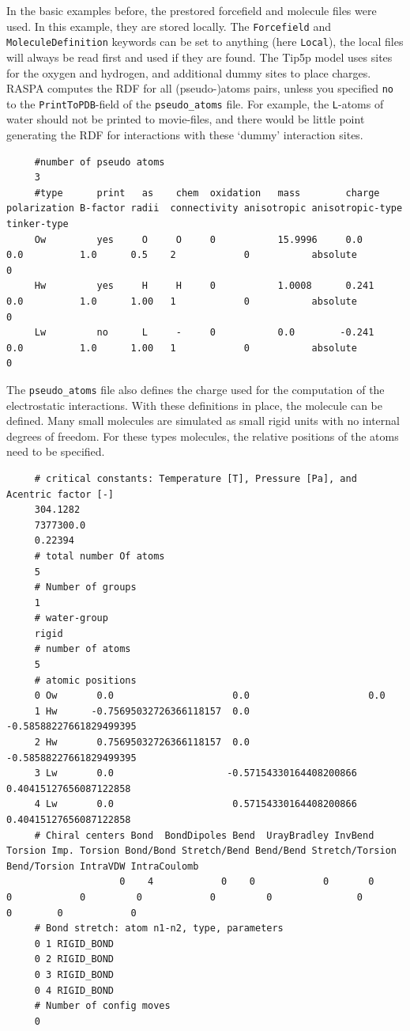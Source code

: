 In the basic examples before, the prestored forcefield and molecule files were used.
In this example, they are stored locally. The \verb+Forcefield+ and \verb+MoleculeDefinition+ keywords
can be set to anything (here \verb+Local+), the local files will always be read first and used if they are found.
The Tip5p model uses sites for the oxygen and hydrogen, and additional dummy sites to place charges.
RASPA computes the RDF for all (pseudo-)atoms pairs, 
unless you specified \verb+no+ to the \verb+PrintToPDB+-field of the \verb+pseudo_atoms+ file.
For example, the \verb+L+-atoms of water should not be printed to movie-files, and there would be little point generating
the RDF for interactions with these `dummy' interaction sites.
\begin{tiny}
\begin{verbatim}
     #number of pseudo atoms
     3
     #type      print   as    chem  oxidation   mass        charge   polarization B-factor radii  connectivity anisotropic anisotropic-type   tinker-type
     Ow         yes     O     O     0           15.9996     0.0      0.0          1.0      0.5    2            0           absolute           0
     Hw         yes     H     H     0           1.0008      0.241    0.0          1.0      1.00   1            0           absolute           0
     Lw         no      L     -     0           0.0        -0.241    0.0          1.0      1.00   1            0           absolute           0
\end{verbatim}
\end{tiny}
The \verb+pseudo_atoms+ file also defines the charge used for the computation of the electrostatic interactions.
With these definitions in place, the molecule can be defined. Many small molecules are simulated as small rigid units with no internal degrees of freedom.
For these types molecules, the relative positions of the atoms need to be specified.
\begin{tiny}
\begin{verbatim}
     # critical constants: Temperature [T], Pressure [Pa], and Acentric factor [-]
     304.1282
     7377300.0
     0.22394
     # total number Of atoms
     5
     # Number of groups
     1
     # water-group
     rigid
     # number of atoms
     5
     # atomic positions
     0 Ow       0.0                     0.0                     0.0
     1 Hw      -0.75695032726366118157  0.0                    -0.58588227661829499395
     2 Hw       0.75695032726366118157  0.0                    -0.58588227661829499395
     3 Lw       0.0                    -0.57154330164408200866  0.40415127656087122858
     4 Lw       0.0                     0.57154330164408200866  0.40415127656087122858
     # Chiral centers Bond  BondDipoles Bend  UrayBradley InvBend  Torsion Imp. Torsion Bond/Bond Stretch/Bend Bend/Bend Stretch/Torsion Bend/Torsion IntraVDW IntraCoulomb
                    0    4            0    0            0       0        0            0         0            0         0               0            0        0            0
     # Bond stretch: atom n1-n2, type, parameters
     0 1 RIGID_BOND
     0 2 RIGID_BOND
     0 3 RIGID_BOND
     0 4 RIGID_BOND
     # Number of config moves
     0
\end{verbatim}
\end{tiny}
